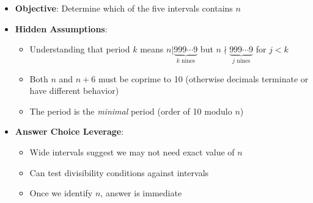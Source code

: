 \documentclass[11pt]{article}
\begin{document}
\begin{problemconfigbox}
\begin{itemize}[leftmargin=*]
    \item \textbf{Objective}: Determine which of the five intervals contains $n$
    
    \item \textbf{Hidden Assumptions}: 
    \begin{itemize}
        \item Understanding that period $k$ means $n | \underbrace{999\cdots9}_{k \text{ nines}}$ but $n \nmid \underbrace{999\cdots9}_{j \text{ nines}}$ for $j < k$
        \item Both $n$ and $n+6$ must be coprime to 10 (otherwise decimals terminate or have different behavior)
        \item The period is the \textit{minimal} period (order of 10 modulo $n$)
    \end{itemize}
    
    \item \textbf{Answer Choice Leverage}: 
    \begin{itemize}
        \item Wide intervals suggest we may not need exact value of $n$
        \item Can test divisibility conditions against intervals
        \item Once we identify $n$, answer is immediate
    \end{itemize}
\end{itemize}


\end{problemconfigbox}
\end{document}
